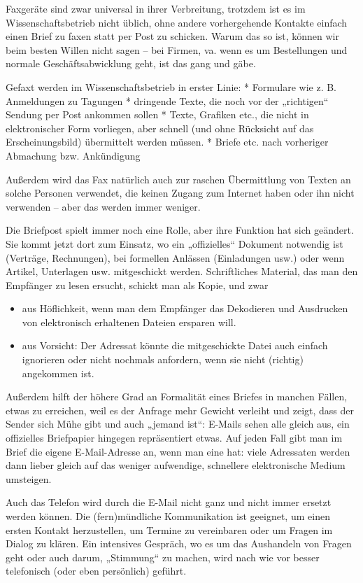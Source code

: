 \documentclass[]{book}
\providecommand{\tightlist}{%
  \setlength{\itemsep}{0pt}\setlength{\parskip}{0pt}}
\theoremstyle{definition}
\theoremstyle{definition}
\theoremstyle{definition}
\theoremstyle{remark}
\begin{document}
Faxgeräte sind zwar universal in ihrer Verbreitung, trotzdem ist es im
Wissenschaftsbetrieb nicht üblich, ohne andere vorhergehende Kontakte
einfach einen Brief zu faxen statt per Post zu schicken. Warum das so
ist, können wir beim besten Willen nicht sagen -- bei Firmen, va. wenn
es um Bestellungen und normale Geschäftsabwicklung geht, ist das gang
und gäbe.

Gefaxt werden im Wissenschaftsbetrieb in erster Linie: * Formulare wie
z. B. Anmeldungen zu Tagungen * dringende Texte, die noch vor der
„richtigen`` Sendung per Post ankommen sollen * Texte, Grafiken etc.,
die nicht in elektronischer Form vorliegen, aber schnell (und ohne
Rücksicht auf das Erscheinungsbild) übermittelt werden müssen. * Briefe
etc. nach vorheriger Abmachung bzw. Ankündigung

Außerdem wird das Fax natürlich auch zur raschen Übermittlung von Texten
an solche Personen verwendet, die keinen Zugang zum Internet haben oder
ihn nicht verwenden -- aber das werden immer weniger.

Die Briefpost spielt immer noch eine Rolle, aber ihre Funktion hat sich
geändert. Sie kommt jetzt dort zum Einsatz, wo ein „offizielles``
Dokument notwendig ist (Verträge, Rechnungen), bei formellen Anlässen
(Einladungen usw.) oder wenn Artikel, Unterlagen usw. mitgeschickt
werden. Schriftliches Material, das man den Empfänger zu lesen ersucht,
schickt man als Kopie, und zwar

\begin{itemize}
\tightlist
\item
  aus Höflichkeit, wenn man dem Empfänger das Dekodieren und Ausdrucken
  von elektronisch erhaltenen Dateien ersparen will.
\item
  aus Vorsicht: Der Adressat könnte die mitgeschickte Datei auch einfach
  ignorieren oder nicht nochmals anfordern, wenn sie nicht (richtig)
  angekommen ist.
\end{itemize}

Außerdem hilft der höhere Grad an Formalität eines Briefes in manchen
Fällen, etwas zu erreichen, weil es der Anfrage mehr Gewicht verleiht
und zeigt, dass der Sender sich Mühe gibt und auch „jemand ist``:
E-Mails sehen alle gleich aus, ein offizielles Briefpapier hingegen
repräsentiert etwas. Auf jeden Fall gibt man im Brief die eigene
E-Mail-Adresse an, wenn man eine hat: viele Adressaten werden dann
lieber gleich auf das weniger aufwendige, schnellere elektronische
Medium umsteigen.

Auch das Telefon wird durch die E-Mail nicht ganz und nicht immer
ersetzt werden können. Die (fern)mündliche Kommunikation ist geeignet,
um einen ersten Kontakt herzustellen, um Termine zu vereinbaren oder um
Fragen im Dialog zu klären. Ein intensives Gespräch, wo es um das
Aushandeln von Fragen geht oder auch darum, „Stimmung`` zu machen, wird
nach wie vor besser telefonisch (oder eben persönlich) geführt.
\end{document}
